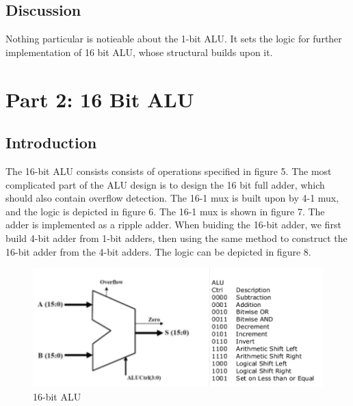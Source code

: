 \documentclass{article}
\begin{document}
\subsection{Discussion}
Nothing particular is notieable about the 1-bit ALU. It sets the logic for further implementation of 16 bit ALU, whose structural builds upon it. 

\section{Part 2: 16 Bit ALU}
\subsection{Introduction}
The 16-bit ALU consists consists of operations specified in figure 5. The most complicated part of the ALU design is to design the 16 bit full adder, which should also contain overflow detection. The 16-1 mux is built upon by 4-1 mux, and the logic is depicted in figure 6. The 16-1 mux is shown in figure 7. The adder is implemented as a ripple adder. When buiding the 16-bit adder, we first build 4-bit adder from 1-bit adders, then using the same method to construct the 16-bit adder from the 4-bit adders. The logic can be depicted in figure 8. 
\begin{figure}[h]
  \centering
  \includegraphics[width=\linewidth]{16-alu.png}
  \caption{16-bit ALU}
  \label{fig:16-ALU}
\end{figure}
\end{document}
